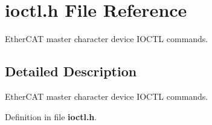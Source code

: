 \section{ioctl.\-h \-File \-Reference}
\label{ioctl_8h}


\-Ether\-C\-A\-T master character device \-I\-O\-C\-T\-L commands.  




\subsection{\-Detailed \-Description}
\-Ether\-C\-A\-T master character device \-I\-O\-C\-T\-L commands. 

\-Definition in file {\bf ioctl.\-h}.

